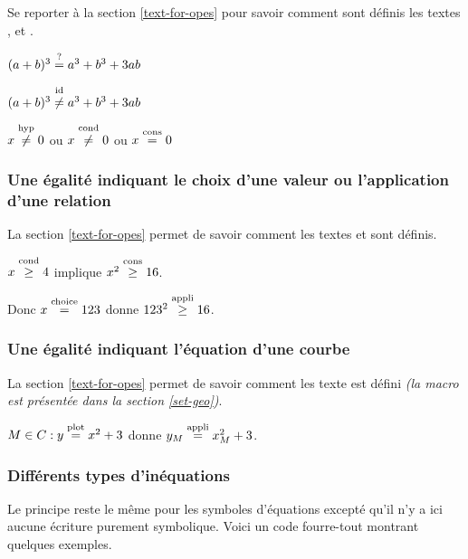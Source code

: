 \documentclass[12pt,a4paper]{article}
\newcommand\setgeo[1]{#1}
\begin{document}
Se reporter à la section \ref{text-for-opes} pour savoir comment sont définis les textes \emph{\og \textopcons \fg} , \emph{\og \textopcond \fg} et \emph{\og \textophyp \fg}.

\begin{latexex}
$(a + b)^3 \eqtest a^3 + b^3 + 3 a b$

$(a + b)^3 \neqid a^3 + b^3 + 3 a b$

$x \neqhyp 0$  ou
$x \neqcond 0$ ou
$x \eqcons 0$
\end{latexex}




\subsubsection{Une égalité indiquant le choix d'une valeur ou l'application d'une relation}

La section \ref{text-for-opes} permet de savoir comment les textes \emph{\og \textopchoice \fg} et \emph{\og \textopappli \fg} sont définis.

\begin{latexex}
$x \geqcond 4$ implique
$x^2 \geqcons 16$.

Donc $x \eqchoice 123$ donne
$123^2 \geqappli 16$.
\end{latexex}




\subsubsection{Une égalité indiquant l'équation d'une courbe}

La section \ref{text-for-opes} permet de savoir comment les texte \emph{\og \textopplot \fg} est défini \emph{(la macro \emph{} est présentée dans la section \ref{set-geo})}.

\begin{latexex}
$M \in \setgeo{C}: y \eqplot x^2 + 3$
donne
$y_M \eqappli x_M^2 + 3$.
\end{latexex}




\subsubsection{Différents types d'inéquations}

Le principe reste le même pour les symboles d'équations excepté qu'il n'y a ici aucune écriture purement symbolique. Voici un code \og fourre-tout \fg{} montrant quelques exemples.
\end{document}
